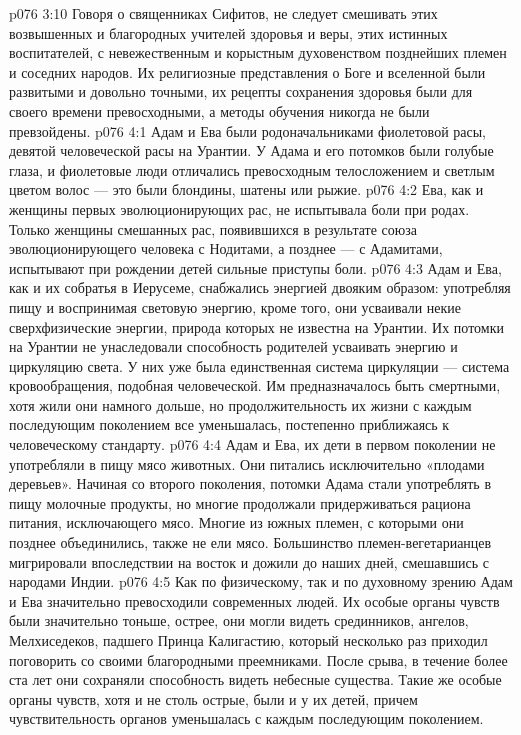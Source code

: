 \vs p076 3:10 Говоря о священниках Сифитов, не следует смешивать этих возвышенных и благородных учителей здоровья и веры, этих истинных воспитателей, с невежественным и корыстным духовенством позднейших племен и соседних народов. Их религиозные представления о Боге и вселенной были развитыми и довольно точными, их рецепты сохранения здоровья были для своего времени превосходными, а методы обучения никогда не были превзойдены.
\vs p076 4:1 Адам и Ева были родоначальниками фиолетовой расы, девятой человеческой расы на Урантии. У Адама и его потомков были голубые глаза, и фиолетовые люди отличались превосходным телосложением и светлым цветом волос --- это были блондины, шатены или рыжие.
\vs p076 4:2 Ева, как и женщины первых эволюционирующих рас, не испытывала боли при родах. Только женщины смешанных рас, появившихся в результате союза эволюционирующего человека с Нодитами, а позднее --- с Адамитами, испытывают при рождении детей сильные приступы боли.
\vs p076 4:3 Адам и Ева, как и их собратья в Иерусеме, снабжались энергией двояким образом: употребляя пищу и воспринимая световую энергию, кроме того, они усваивали некие сверхфизические энергии, природа которых не известна на Урантии. Их потомки на Урантии не унаследовали способность родителей усваивать энергию и циркуляцию света. У них уже была единственная система циркуляции --- система кровообращения, подобная человеческой. Им предназначалось быть смертными, хотя жили они намного дольше, но продолжительность их жизни с каждым последующим поколением все уменьшалась, постепенно приближаясь к человеческому стандарту.
\vs p076 4:4 Адам и Ева, их дети в первом поколении не употребляли в пищу мясо животных. Они питались исключительно «плодами деревьев». Начиная со второго поколения, потомки Адама стали употреблять в пищу молочные продукты, но многие продолжали придерживаться рациона питания, исключающего мясо. Многие из южных племен, с которыми они позднее объединились, также не ели мясо. Большинство племен\hyp{}вегетарианцев мигрировали впоследствии на восток и дожили до наших дней, смешавшись с народами Индии.
\vs p076 4:5 Как по физическому, так и по духовному зрению Адам и Ева значительно превосходили современных людей. Их особые органы чувств были значительно тоньше, острее, они могли видеть срединников, ангелов, Мелхиседеков, падшего Принца Калигастию, который несколько раз приходил поговорить со своими благородными преемниками. После срыва, в течение более ста лет они сохраняли способность видеть небесные существа. Такие же особые органы чувств, хотя и не столь острые, были и у их детей, причем чувствительность органов уменьшалась с каждым последующим поколением.
